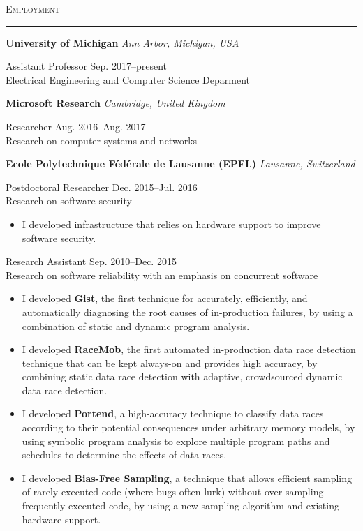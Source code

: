 \documentclass[10pt]{article}
\newcommand{\mysec}[1]{\vspace{2em}\textsc{\large #1}\vspace{1mm}\hrule\vspace{2mm}}
\newcommand{\mysub}[3]{\textbf{#1} {#2} \hfill {\em #3}}
\newcommand{\myssub}[1]{\hspace*{2mm}\parbox{163mm}{#1}\vspace*{2mm}}
\begin{document}
\mysec{Employment}

\mysub{University of Michigan}{}{Ann Arbor, Michigan, USA} \\
\myssub{Assistant Professor\vspace{1mm} \hfill Sep. 2017--present \\
Electrical Engineering and Computer Science Deparment}

\mysub{Microsoft Research}{}{Cambridge, United Kingdom} \\
\myssub{\vspace{1mm}Researcher \hfill Aug. 2016--Aug. 2017 \\
Research on computer systems and networks}

\newpage

\mysub{Ecole Polytechnique F\'ed\'erale de Lausanne (EPFL)}{}{Lausanne, Switzerland} \\
\myssub{\vspace{1mm}Postdoctoral Researcher \hfill Dec. 2015--Jul. 2016 \\
Research on software security
\begin{itemize}
\item{I developed infrastructure that relies on hardware support to improve software security.}
\end{itemize}
}

\myssub{\vspace{1mm}Research Assistant \hfill Sep. 2010--Dec. 2015 \\
Research on software reliability with an emphasis on concurrent software
\vspace{-1mm}
\begin{itemize}
\setlength\itemsep{0em}
\item{I developed \textbf{Gist}, the first technique for accurately, efficiently, and automatically diagnosing the root causes of in-production failures, by using a combination of static and dynamic program analysis.}
\item{I developed \textbf{RaceMob}, the first automated in-production data race detection technique that can be kept always-on and provides high accuracy, by combining static data race detection with adaptive, crowdsourced dynamic data race detection.}
\item{I developed \textbf{Portend}, a high-accuracy technique to classify data races according to their potential consequences under arbitrary memory models, by using symbolic program analysis to explore multiple program paths and schedules to determine the effects of data races.}
\item{I developed \textbf{Bias-Free Sampling}, a technique that allows efficient sampling of rarely executed code (where bugs often lurk) without over-sampling frequently executed code, by using a new sampling algorithm and existing hardware support.}\\
\end{itemize}
\vspace{-5mm}
}
\end{document}

